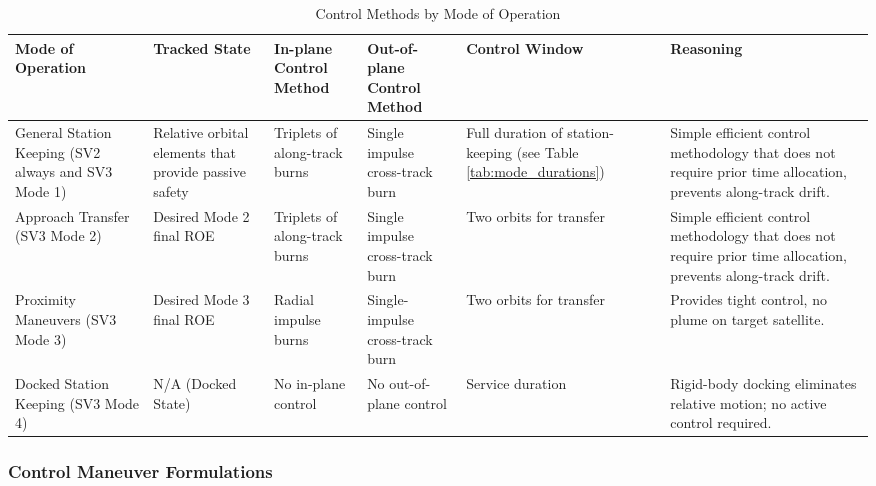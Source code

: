\begin{table}[H]
    \centering
    \caption{Control Methods by Mode of Operation}
    \renewcommand{\arraystretch}{1.3}

    \begin{tabularx}{\textwidth}{|>{\raggedright\arraybackslash}p{}|%
                                      >{\raggedright\arraybackslash}p{}|%
                                      >{\raggedright\arraybackslash}p{}|%
                                      >{\raggedright\arraybackslash}p{}|%
                                      >{\raggedright\arraybackslash}p{}|%
                                      >{\raggedright\arraybackslash}X|}
        \rowcolor{lightgray}
        \hline
        \textbf{Mode of Operation} & \textbf{Tracked State} & \textbf{In-plane Control Method} & \textbf{Out-of-plane Control Method} & \textbf{Control Window} & \textbf{Reasoning} \\
        \hline
        General Station Keeping (SV2 always and SV3 Mode 1) & Relative orbital elements that provide passive safety & Triplets of along-track burns & Single impulse cross-track burn & Full duration of station-keeping (see Table \ref{tab:mode_durations}) & Simple efficient control methodology that does not require prior time allocation, prevents along-track drift. \\
        \hline
        Approach Transfer (SV3 Mode 2) & Desired Mode 2 final ROE & Triplets of along-track burns & Single impulse cross-track burn & Two orbits for transfer & Simple efficient control methodology that does not require prior time allocation, prevents along-track drift. \\
        \hline
        Proximity Maneuvers (SV3 Mode 3) & Desired Mode 3 final ROE & Radial impulse burns & Single-impulse cross-track burn & Two orbits for transfer & Provides tight control, no plume on target satellite. \\
        \hline
        Docked Station Keeping (SV3 Mode 4) & N/A (Docked State) & No in-plane control & No out-of-plane control & Service duration & Rigid-body docking eliminates relative motion; no active control required. \\
        \hline
    \end{tabularx}
    \label{tab:mode_control_methods}
\end{table}



\subsubsection{Control Maneuver Formulations}




